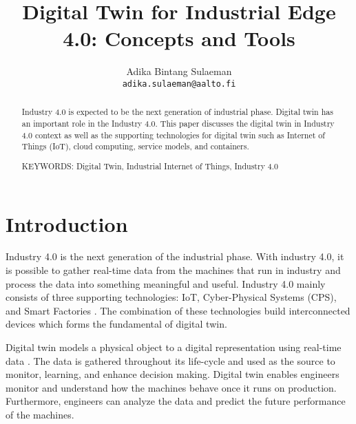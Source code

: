 \documentclass[article]{aaltoseries}
\begin{document}
 

\title{Digital Twin for Industrial Edge 4.0: Concepts and Tools}

\author{Adika Bintang Sulaeman%
\\\textnormal{\texttt{adika.sulaeman@aalto.fi}}} %


\maketitle


\begin{abstract}
  Industry 4.0 is expected to be the next generation of industrial phase. Digital twin has an important role in the Industry 4.0. This paper discusses the digital twin in Industry 4.0 context as well as the supporting technologies for digital twin such as Internet of Things (IoT), cloud computing, service models, and containers.
  
\vspace{3mm}
\noindent KEYWORDS: Digital Twin, Industrial Internet of Things, Industry 4.0

\end{abstract}




\section{Introduction}

Industry 4.0 is the next generation of the industrial phase. With industry 4.0, it is possible to gather real-time data from the machines that run in industry and process the data into something meaningful and useful. Industry 4.0 mainly consists of three supporting technologies: IoT, Cyber-Physical Systems (CPS), and Smart Factories \cite{hermann2016design}. The combination of these technologies build interconnected devices which forms the fundamental of digital twin.

Digital twin models a physical object to a digital representation using real-time data \cite{Cheatshe3:online}. The data is gathered throughout its life-cycle and used as the source to monitor, learning, and enhance decision making. Digital twin enables engineers monitor and understand how the machines behave once it runs on production. Furthermore, engineers can analyze the data and predict the future performance of the machines.
\end{document}
